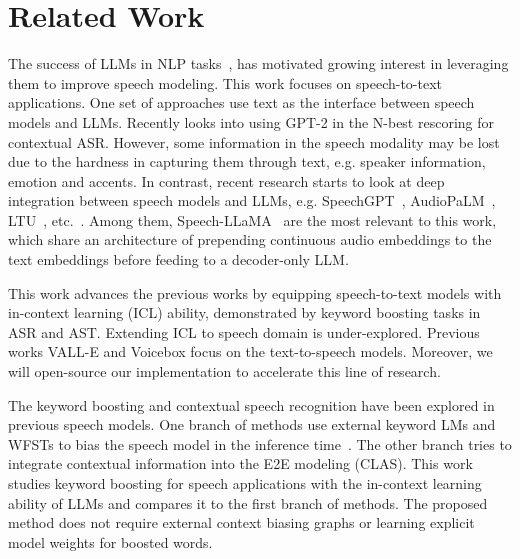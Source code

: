 \documentclass{article}
\begin{document}
\vspace{-1em}
\section{Related Work}
\label{sec:related}
\vspace{-0.4em}
The success of LLMs in NLP tasks~\cite{openai2023gpt,anil2023palm}, has motivated growing interest in leveraging them to improve speech modeling.
This work focuses on speech-to-text applications.
One set
of approaches use text as the interface between speech models and LLMs\cite{huang2023audiogpt, chen2023x,chen2023large,ma2023n}. 
Recently \cite{sun2023can} looks into using GPT-2 in the N-best rescoring 
 for contextual ASR.
However,
some information in the speech modality may be lost due to the hardness in capturing them through text, e.g. speaker information, emotion and accents. In contrast, recent research starts to look at deep integration between speech models and LLMs, e.g. SpeechGPT~\cite{zhang2023speechgpt}, AudioPaLM~\cite{rubenstein2023audiopalm}, LTU~\cite{gong2023listen}, etc.~\cite{ling2023adapting,wu2023decoder,fathullah2023prompting,wang2023speech}.
Among them, Speech-LLaMA~\cite{wu2023decoder,fathullah2023prompting} are the most relevant to this work, which share an architecture of prepending  continuous audio embeddings to the text  embeddings before feeding to a decoder-only LLM. 

This work advances the previous works by equipping speech-to-text models with in-context learning (ICL) ability,
demonstrated by keyword boosting tasks in ASR and AST.
Extending ICL to speech domain is under-explored. Previous works VALL-E\cite{wang2023neural} and Voicebox\cite{le2023voicebox} focus on the text-to-speech models. 
%
Moreover, we will open-source our implementation to accelerate this line of research.

The keyword boosting and contextual speech recognition have been explored in previous speech models. 
One branch of methods use external keyword LMs and WFSTs to bias the speech model in the inference time~\cite{williams2018contextual}. The other branch tries to integrate contextual information into the
E2E modeling (CLAS)\cite{pundak2018deep}.
%
This work studies keyword boosting for speech applications with the in-context learning ability of LLMs and compares it to the first branch of methods. The proposed method does not require external context biasing graphs or learning explicit  model weights for boosted words.
\end{document}
